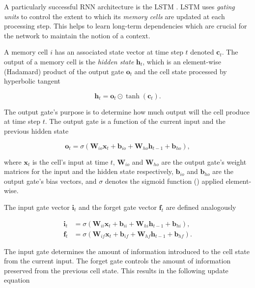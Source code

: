 A particularly successful \ac{RNN} architecture is the \ac{LSTM} \cite{Hochreiter1997}. \ac{LSTM} uses \emph{gating units} to control the extent to which its \emph{memory cells} are updated at each processing step. This helps to learn long-term dependencies which are crucial for the network to maintain the notion of a context.

A memory cell $i$ has an associated state vector at time step $t$ denoted $\pmb{c}_t$. The output of a memory cell is the \emph{hidden state} $\pmb{h}_t$, which is an element-wise (Hadamard) product of the output gate $\pmb{o}_t$ and the cell state processed by hyperbolic tangent

\begin{equation}
  \pmb{h}_t = \pmb{o}_t \odot \tanh (\pmb{c}_t).
  \label{eq:lstm_hidden_state}
\end{equation}

The output gate's purpose is to determine how much output will the cell produce at time step $t$. The output gate is a function of the current input and the previous hidden state

\begin{equation}
  \pmb{o}_t = \sigma (\pmb{W}_{io} \pmb{x}_t + \pmb{b}_{io} + \pmb{W}_{ho} \pmb{h}_{t-1} + \pmb{b}_{ho}),
  \label{eq:lstm_output_gate}
\end{equation}

where $\pmb{x}_t$ is the cell's input at time $t$, $\pmb{W}_{io}$ and $\pmb{W}_{ho}$ are the output gate's weight matrices for the input and the hidden state respectively, $\pmb{b}_{io}$ and $\pmb{b}_{ho}$ are the output gate's bias vectors, and $\sigma$ denotes the sigmoid function () applied element-wise.

The input gate vector $\pmb{i}_t$ and the forget gate vector $\pmb{f}_t$ are defined analogously

\begin{align}
  \pmb{i}_t &= \sigma (\pmb{W}_{ii} \pmb{x}_t + \pmb{b}_{ii} + \pmb{W}_{hi} \pmb{h}_{t-1} + \pmb{b}_{hi}), \label{eq:lstm_input_gate}\\
  \pmb{f}_t &= \sigma (\pmb{W}_{if} \pmb{x}_t + \pmb{b}_{if} + \pmb{W}_{hf} \pmb{h}_{t-1} + \pmb{b}_{hf}). \label{eq:lstm_forget_gate}
\end{align}

The input gate determines the amount of information introduced to the cell state from the current input. The forget gate controls the amount of information preserved from the previous cell state. This results in the following update equation

